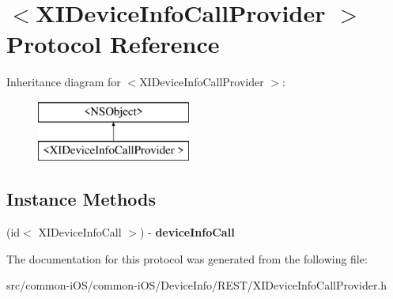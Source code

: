 \hypertarget{protocol_x_i_device_info_call_provider_01-p}{}\section{$<$X\+I\+Device\+Info\+Call\+Provider $>$ Protocol Reference}
\label{protocol_x_i_device_info_call_provider_01-p}
Inheritance diagram for $<$X\+I\+Device\+Info\+Call\+Provider $>$\+:\begin{figure}[H]
\begin{center}
\leavevmode
\includegraphics[height=2.000000cm]{protocol_x_i_device_info_call_provider_01-p}
\end{center}
\end{figure}
\subsection*{Instance Methods}
\begin{DoxyCompactItemize}
\item 
\hypertarget{protocol_x_i_device_info_call_provider_01-p_ac17f4147d34fda623ad8722a06d33523}{}\label{protocol_x_i_device_info_call_provider_01-p_ac17f4147d34fda623ad8722a06d33523} 
(id$<$ X\+I\+Device\+Info\+Call $>$) -\/ {\bfseries device\+Info\+Call}
\end{DoxyCompactItemize}


The documentation for this protocol was generated from the following file\+:\begin{DoxyCompactItemize}
\item 
src/common-\/i\+O\+S/common-\/i\+O\+S/\+Device\+Info/\+R\+E\+S\+T/X\+I\+Device\+Info\+Call\+Provider.\+h\end{DoxyCompactItemize}
